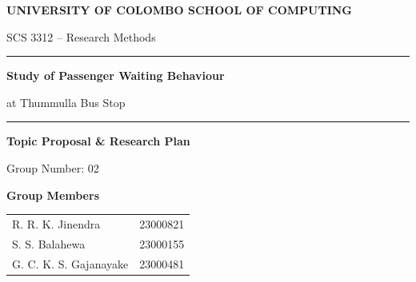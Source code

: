 \documentclass[12pt,a4paper]{report}
\begin{document}
\begin{titlepage}
    \thispagestyle{empty}
    \begin{center}

        \vspace*{0.8cm}

        {\Large\bfseries UNIVERSITY OF COLOMBO SCHOOL OF COMPUTING\par}
        \vspace{0.2cm}
        {\large SCS 3312 -- Research Methods\par}

        \vspace{1.4cm}

        \rule{0.78\textwidth}{0.5pt}\par
        \vspace{0.4cm}

        {\LARGE\bfseries Study of Passenger Waiting Behaviour\par}
        \vspace{0.2cm}
        {\Large at Thummulla Bus Stop\par}

        \vspace{0.4cm}
        \rule{0.78\textwidth}{0.5pt}\par

        \vspace{1.0cm}

        {\large\bfseries Topic Proposal \& Research Plan\par}
        \vspace{0.15cm}

        \vspace{0.15cm}
        {\large Group Number: 02\par}

        \vspace{0.9cm}

        {\large\bfseries Group Members\par}
        \vspace{0.35cm}

        \begin{tabular}{@{}p{7.5cm}r@{}}
            R. R. K. Jinendra      & 23000821 \\[0.2cm]
            S. S. Balahewa         & 23000155 \\[0.2cm]
            G. C. K. S. Gajanayake & 23000481 \\
        \end{tabular}

        \vfill



    \end{center}
\end{titlepage}%
\setcounter{secnumdepth}{-1}
\end{document}
